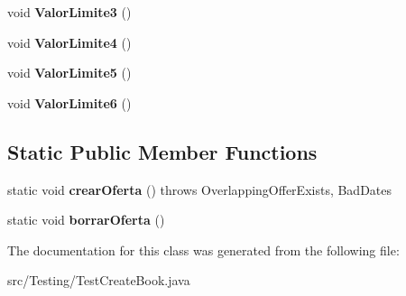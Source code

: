 \begin{DoxyCompactItemize}
\mbox{\label{class_testing_1_1_test_create_book_a99968cb22ff2b4012d79a191144f03d1}} 
void {\bfseries Valor\+Limite3} ()
\item 
\mbox{\label{class_testing_1_1_test_create_book_aa03012fcb19cb39318030c62e0d5c2c0}} 
void {\bfseries Valor\+Limite4} ()
\item 
\mbox{\label{class_testing_1_1_test_create_book_a2035e4dc156b0c064f828a621a5d8232}} 
void {\bfseries Valor\+Limite5} ()
\item 
\mbox{\label{class_testing_1_1_test_create_book_acadc2ebf7b47c3d62a7164d7e1f009ad}} 
void {\bfseries Valor\+Limite6} ()
\end{DoxyCompactItemize}
\subsection*{Static Public Member Functions}
\begin{DoxyCompactItemize}
\item 
\mbox{\label{class_testing_1_1_test_create_book_a36cdebeb27b2395e4c28724a1455a27f}} 
static void {\bfseries crear\+Oferta} ()  throws Overlapping\+Offer\+Exists, Bad\+Dates 
\item 
\mbox{\label{class_testing_1_1_test_create_book_a34497f1cf0ff53a875e40ad07f52e0d2}} 
static void {\bfseries borrar\+Oferta} ()
\end{DoxyCompactItemize}


The documentation for this class was generated from the following file\+:\begin{DoxyCompactItemize}
\item 
src/\+Testing/Test\+Create\+Book.\+java\end{DoxyCompactItemize}
